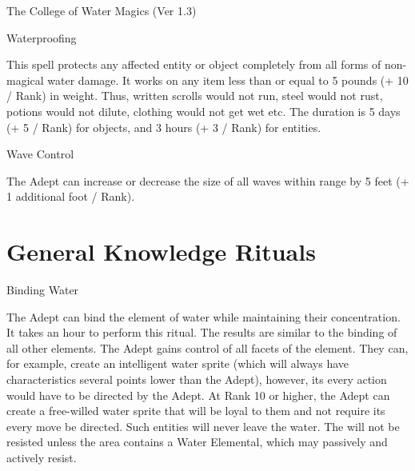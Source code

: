 \begin{Chapter}{The College of Water Magics (Ver 1.3)}
\begin{spell}[G-13]{Waterproofing}

\begin{effects}
This spell protects any affected entity or object completely from all
forms of non-magical water damage.  It works on any item less than or
equal to 5 pounds (+ 10 / Rank) in weight.  Thus, written scrolls
would not run, steel would not rust, potions would not dilute,
clothing would not get wet etc.  The duration is 5 days (+ 5 / Rank)
for objects, and 3 hours (+ 3 / Rank) for entities.
\end{effects}
\end{spell}

\begin{spell}[G-14]{Wave Control}

\begin{effects}
The Adept can increase or decrease the size of all waves within range
by 5 feet (+ 1 additional foot / Rank).
\end{effects}
\end{spell}


\section{General Knowledge Rituals}

\begin{ritual}[Q-1]{Binding Water}

\begin{effects}
The Adept can bind the element of water while maintaining their
concentration.  It takes an hour to perform this ritual.  The results
are similar to the binding of all other elements.  The Adept gains
control of all facets of the element. They can, for example, create an
intelligent water sprite (which will always have characteristics
several points lower than the Adept), however, its every action would
have to be directed by the Adept. At Rank 10 or higher, the Adept can
create a free-willed water sprite that will be loyal to them and not
require its every move be directed.  Such entities will never leave
the water.  The will not be resisted unless the area contains a Water
Elemental, which may passively and actively resist.
\end{effects}
\end{ritual}



\end{Chapter}
